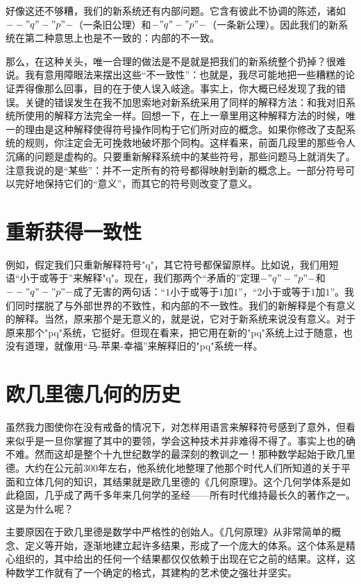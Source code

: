 好像这还不够糟，我们的新系统还有内部问题。它含有彼此不协调的陈述，诸如$--"q"-"p"-$（一条旧公理）和$-"q"-"p"-$（一条新公理）。因此我们的新系统在第二种意思上也是不一致的：内部的不一致。

那么，在这种关头，唯一合理的做法是不是就是把我们的新系统整个扔掉？很难说。我有意用障眼法来摆出这些“不一致性”：也就是，我尽可能地把一些糟糕的论证弄得像那么回事，目的在于使人误入岐途。事实上，你大概已经发现了我的错误。关键的错误发生在我不加思索地对新系统采用了同样的解释方法：和我对旧系统所使用的解释方法完全一样。回想一下，在上一章里用这种解释方法的时候，唯一的理由是这种解释使得符号操作同构于它们所对应的概念。如果你修改了支配系统的规则，你注定会无可挽救地破坏那个同构。这样看来，前面几段里的那些令人沉痛的问题是虚构的。只要重新解释系统中的某些符号，那些问题马上就消失了。注意我说的是“某些”：并不一定所有的符号都得映射到新的概念上。一部分符号可以完好地保持它们的“意义”，而其它的符号则改变了意义。

\section{重新获得一致性}

例如，假定我们只重新解释符号"q"，其它符号都保留原样。比如说，我们用短语“小于或等于”来解释"q"。现在，我们那两个“矛盾的”定理$-"q"-"p"-$和$--"q"-"p"-$成了无害的两句话：“$1$小于或等于$1$加$1$”，“$2$小于或等于$1$加$1$”。我们同时摆脱了与外部世界的不致性，和内部的不一致性。我们的新解释是个有意义的解释。当然，原来那个是无意义的，就是说，它对于新系统来说没有意义。对于原来那个"pq"系统，它挺好。但现在看来，把它用在新的"pq"系统上过于随意，也没有道理，就像用“马-苹果-幸福”来解释旧的"pq"系统一样。

\section{欧几里德几何的历史}

虽然我力图使你在没有戒备的情况下，对怎样用语言来解释符号感到了意外，但看来似乎是一旦你掌握了其中的要领，学会这种技术并非难得不得了。事实上也的确不难。然而这却是整个十九世纪数学的最深刻的教训之一！那种数学起始于欧几里德。大约在公元前300年左右，他系统化地整理了他那个时代人们所知道的关于平面和立体几何的知识，其结果就是欧几里德的《几何原理》。这个几何学体系是如此稳固，几乎成了两千多年来几何学的圣经——所有时代维持最长久的著作之一。这是为什么呢？

主要原因在于欧几里德是数学中严格性的创始人。《几何原理》从非常简单的概念、定义等开始，逐渐地建立起许多结果，形成了一个庞大的体系。这个体系是精心组织的，其中给出的任何一个结果都仅仅依赖于出现在它之前的结果。这样，这种数学工作就有了一个确定的格式，其建构的艺术使之强壮并坚实。

